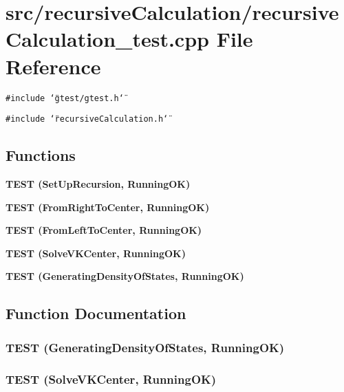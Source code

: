 \section{src/recursive\-Calculation/recursive\-Calculation\_\-test.cpp File Reference}
\label{recursiveCalculation__test_8cpp}
{\tt \#include \char`\"{}gtest/gtest.h\char`\"{}}\par
{\tt \#include \char`\"{}recursive\-Calculation.h\char`\"{}}\par
\subsection*{Functions}
\begin{CompactItemize}
\item 
\bf{TEST} (Set\-Up\-Recursion, Running\-OK)
\item 
\bf{TEST} (From\-Right\-To\-Center, Running\-OK)
\item 
\bf{TEST} (From\-Left\-To\-Center, Running\-OK)
\item 
\bf{TEST} (Solve\-VKCenter, Running\-OK)
\item 
\bf{TEST} (Generating\-Density\-Of\-States, Running\-OK)
\end{CompactItemize}


\subsection{Function Documentation}
\subsubsection{\setlength{\rightskip}{0pt plus 5cm}TEST (Generating\-Density\-Of\-States, Running\-OK)}\label{recursiveCalculation__test_8cpp_97cc0d9e34623eae4af734bf74fced46}


\subsubsection{\setlength{\rightskip}{0pt plus 5cm}TEST (Solve\-VKCenter, Running\-OK)}\label{recursiveCalculation__test_8cpp_5cd42ee4c494c8e9999f4e93f5dcfa6b}


